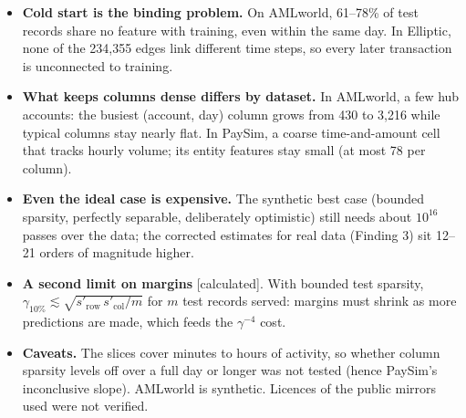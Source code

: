\documentclass[10pt]{article}
\newcommand{\evlabel}[1]{\textsf{\small[#1]}}
\newenvironment{sectionblock}
{%
    \par
    \vspace{2pt}
    \noindent
    \begin{minipage}{\textwidth}
}
{%
    \end{minipage}
    \par
    \vspace{5pt}
}
\begin{document}
\begin{sectionblock}

\begin{itemize}
    \item \textbf{Cold start is the binding problem.} On AMLworld, 61--78\% of test records share no feature with training, even within the same day. In Elliptic, none of the 234{,}355 edges link different time steps, so every later transaction is unconnected to training.
    \item \textbf{What keeps columns dense differs by dataset.} In AMLworld, a few hub accounts: the busiest (account, day) column grows from 430 to 3{,}216 while typical columns stay nearly flat. In PaySim, a coarse time-and-amount cell that tracks hourly volume; its entity features stay small (at most 78 per column).
    \item \textbf{Even the ideal case is expensive.} The synthetic best case (bounded sparsity, perfectly separable, deliberately optimistic) still needs about $10^{16}$ passes over the data; the corrected estimates for real data (Finding 3) sit 12--21 orders of magnitude higher.
    \item \textbf{A second limit on margins} \evlabel{calculated}. With bounded test sparsity, $\gamma_{10\%} \lesssim \sqrt{s'_{\mathrm{row}}\,s'_{\mathrm{col}}/m}$ for $m$ test records served: margins must shrink as more predictions are made, which feeds the $\gamma^{-4}$ cost.
    \item \textbf{Caveats.} The slices cover minutes to hours of activity, so whether column sparsity levels off over a full day or longer was not tested (hence PaySim's inconclusive slope). AMLworld is synthetic. Licences of the public mirrors used were not verified.
\end{itemize}

\end{sectionblock}
\end{document}
